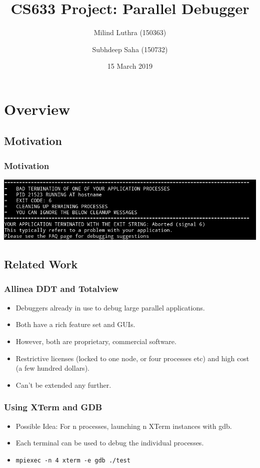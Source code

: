 \documentclass{beamer}
\title{CS633 Project: Parallel Debugger}
\author[Milind, Subhdeep]{Milind Luthra (150363) \and Subhdeep Saha (150732)}
\date{15 March 2019}
\begin{document}
\frame{\titlepage}

\section{Overview}

\subsection{Motivation}
\begin{frame}
  \frametitle{Motivation}
  \begin{center}
      \includegraphics[width=\textwidth]{motivation}
  \end{center}
\end{frame}

\subsection{Related Work}

\begin{frame}
  \frametitle{Allinea DDT and Totalview}
  \begin{itemize}
  \item <1-> Debuggers already in use to debug large parallel applications.
  \item <2-> Both have a rich feature set and GUIs.
  \item <3-> However, both are proprietary, commercial software.
  \item <5-> Restrictive licenses (locked to one node, or four processes etc) and high cost (a few hundred dollars).
  \item <6-> Can't be extended any further.
  \end{itemize}
\end{frame}

\begin{frame}[fragile]
  \frametitle{Using XTerm and GDB}
  \begin{itemize}
  \item <1-> Possible Idea: For n processes, launching n XTerm instances with gdb.
  \item <2-> Each terminal can be used to debug the individual processes.
  \item <3-> \texttt{mpiexec -n 4 xterm -e gdb ./test}
  \end{itemize}
\end{frame}
\end{document}
